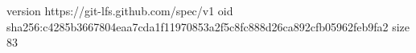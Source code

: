 version https://git-lfs.github.com/spec/v1
oid sha256:c4285b3667804eaa7cda1f11970853a2f5c8fc888d26ca892cfb05962feb9fa2
size 83
